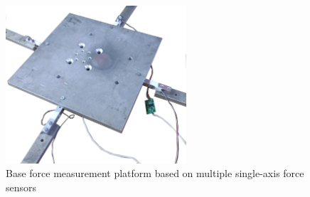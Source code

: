 \begin{figure}
    \centering
    \includegraphics[width=0.6\textwidth]{slike/platform.png}
    \caption{Base force measurement platform based on multiple single-axis force sensors}
    \label{fig:Platform}
\end{figure}

\newpage